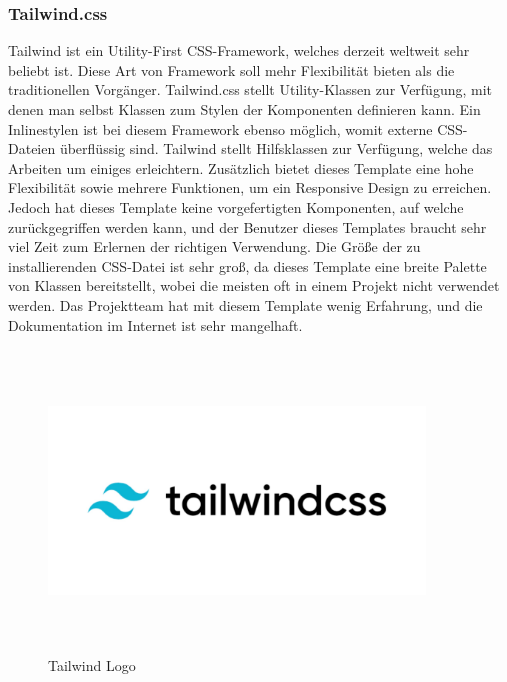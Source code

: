 \newpage
\subsubsection{Tailwind.css}
Tailwind ist ein Utility-First CSS-Framework, welches derzeit weltweit sehr beliebt ist. Diese Art von Framework soll mehr Flexibilität bieten als die traditionellen Vorgänger. Tailwind.css stellt Utility-Klassen zur Verfügung, mit denen man selbst Klassen zum Stylen der Komponenten definieren kann. Ein Inlinestylen ist bei diesem Framework ebenso möglich, womit externe CSS-Dateien überflüssig sind. Tailwind stellt Hilfsklassen zur Verfügung, welche das Arbeiten um einiges erleichtern. Zusätzlich bietet dieses Template eine hohe Flexibilität sowie mehrere Funktionen, um ein Responsive Design zu erreichen. Jedoch hat dieses Template keine vorgefertigten Komponenten, auf welche zurückgegriffen werden kann, und der Benutzer dieses Templates braucht sehr viel Zeit zum Erlernen der richtigen Verwendung. Die Größe der zu installierenden CSS-Datei ist sehr groß, da dieses Template eine breite Palette von Klassen bereitstellt, wobei die meisten oft in einem Projekt nicht verwendet werden. Das Projektteam hat mit diesem Template wenig Erfahrung, und die Dokumentation im Internet ist sehr mangelhaft.
\begin{figure}[h]
	\centering
	\includegraphics[height=8cm,width=10cm]{images/Tailwind}
	\caption{Tailwind Logo}
	\label{fig:Tailwind Logo}
\end{figure}


\newpage
